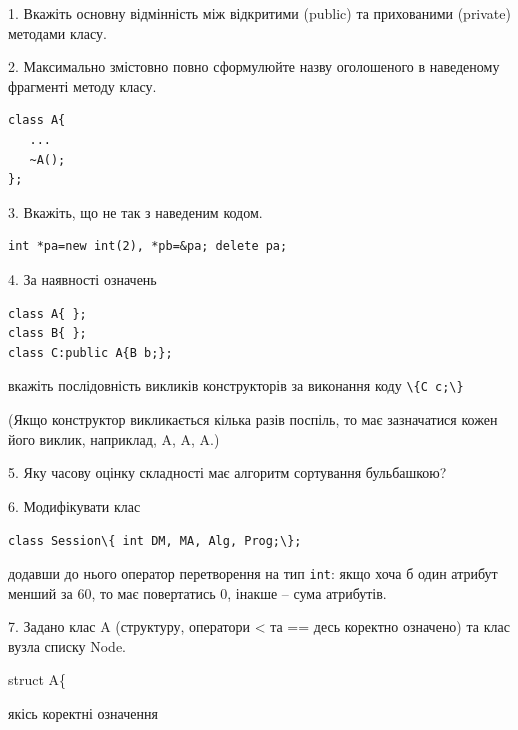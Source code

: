 \documentclass[12pt, ukrainian]{article}
\def\code#1{\Verb!#1!}
\begin{document}
{%
1. Вкажіть основну відмінність між відкритими (public) та прихованими (private) методами класу.%
\par
\vspace{2mm}
2. Максимально змістовно повно сформулюйте назву оголошеного в наведеному фрагменті методу класу.
\vspace{-3mm}
\begin{verbatim}class A{
   ...
   ~A();
};\end{verbatim}
\vspace{-3mm}
\par
\vspace{2mm}
3. Вкажіть, що не так з наведеним кодом.
\vspace{-3mm}
\begin{verbatim}int *pa=new int(2), *pb=&pa; delete pa;\end{verbatim}
\vspace{-3mm}
\par
\vspace{2mm}
4. За наявності означень
\vspace{-3mm}
\begin{verbatim}
class A{ };
class B{ };
class C:public A{B b;};\end{verbatim}
\vspace{-3mm}
вкажіть послідовність викликів конструкторів за виконання коду \code{\{C c;\}} 

(Якщо конструктор викликається кілька разів поспіль, то має зазначатися кожен його виклик, наприклад, A, A, A.)

\vspace{2mm}
5. Яку часову оцінку складності має алгоритм сортування бульбашкою?
\par
\vspace{2mm}
6. Модифікувати клас 

\qquad\code{class Session\{ int DM, MA, Alg, Prog;\};} 


додавши до нього оператор перетворення на тип \code{int}: якщо хоча б один атрибут менший за 60, то має повертатись 0, інакше -- сума атрибутів.%
\par
\vspace{2mm}
7. 
Задано клас A (структуру, оператори < та == десь коректно означено) та клас вузла списку Node.

struct A\{

\quad  якісь коректні означення 

}
\end{document}

